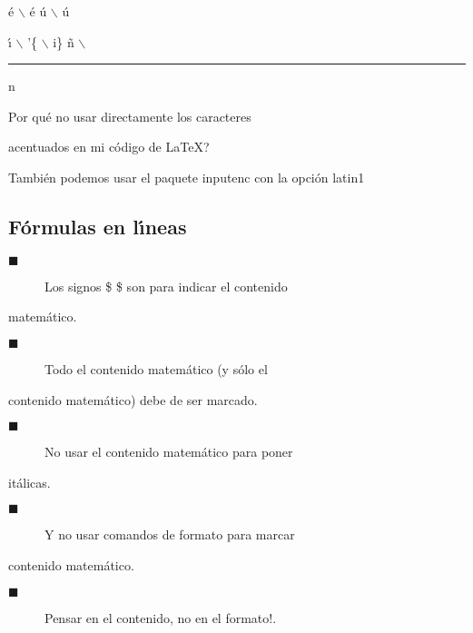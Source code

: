 \'{e}
$\backslash$%
\'e \'{u}
$\backslash$%
\'u

\'{\i}
$\backslash$%
'\{%
$\backslash$%
i\} \~{n}
$\backslash$%
\protect\rule{0.1in}{0.1in}
n

\textquestiondown Por qu\'{e} no usar directamente los caracteres

acentuados en mi c\'{o}digo de \LaTeX?

Tambi\'{e}n podemos usar el paquete inputenc con la opci\'{o}n latin1

\subsection{F\'{o}rmulas en l\'{\i}neas}

\begin{description}
\item[$\blacksquare$] Los signos \$ \$ son para indicar el contenido
\end{description}

matem\'{a}tico.

\begin{description}
\item[$\blacksquare$] Todo el contenido matem\'{a}tico (y s\'{o}lo el
\end{description}

contenido matem\'{a}tico) debe de ser marcado.

\begin{description}
\item[$\blacksquare$] No usar el contenido matem\'{a}tico para poner
\end{description}

it\'{a}licas.

\begin{description}
\item[$\blacksquare$] Y no usar comandos de formato para marcar
\end{description}

contenido matem\'{a}tico.

\begin{description}
\item[$\blacksquare$] Pensar en el contenido, \textexclamdown no en el formato!.
\end{description}

